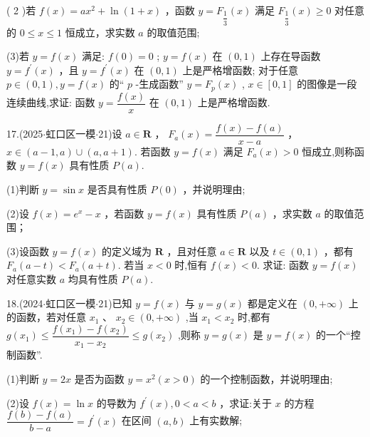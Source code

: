 ( 2 )若 $f\left( x\right)  = a{x}^{2} + \ln \left( {1 + x}\right)$ ，函数 $y = {F}_{\dfrac{1}{3}}\left( x\right)$ 满足 ${F}_{\dfrac{1}{3}}\left( x\right)  \geq  0$ 对任意的 $0 \leq  x \leq  1$ 恒成立，求实数 $a$ 的取值范围;

(3)若 $y = f\left( x\right)$ 满足:   $f\left( 0\right)  = 0$ ;    $y = f\left( x\right)$ 在 $\left( {0,1}\right)$ 上存在导函数 $y = {f}^{\prime }\left( x\right)$ ，且 $y = {f}^{\prime }\left( x\right)$ 在 $\left( {0,1}\right)$ 上是严格增函数;    对于任意 $p \in  \left( {0,1}\right) ,y = f\left( x\right)$ 的“ $p$ -生成函数” $y = {F}_{p}\left( x\right)$ , $x \in  \left\lbrack  {0,1}\right\rbrack$ 的图像是一段连续曲线,求证: 函数 $y = \dfrac{f\left( x\right) }{x}$ 在 $\left( {0,1}\right)$ 上是严格增函数.

17.(2025$\cdot$虹口区一模$\cdot$21)设 $a \in  \mathbf{R}$ ， ${F}_{a}\left( x\right)  = \dfrac{f\left( x\right)  - f\left( a\right) }{x - a}$ ， $x \in  \left( {a - 1,a}\right)  \cup  \left( {a,a + 1}\right)$. 若函数 $y =  f\left( x\right)$ 满足 ${F}_{a}\left( x\right)  > 0$ 恒成立,则称函数 $y = f\left( x\right)$ 具有性质 $P\left( a\right)$.

(1)判断 $y = \sin x$ 是否具有性质 $P\left( 0\right)$ ，并说明理由;

(2)设 $f\left( x\right)  = {{e}}^{x} - x$ ，若函数 $y = f\left( x\right)$ 具有性质 $P\left( a\right)$ ，求实数 $a$ 的取值范围；

(3)设函数 $y = f\left( x\right)$ 的定义域为 $\mathbf{R}$ ，且对任意 $a \in  \mathbf{R}$ 以及 $t \in  \left( {0,1}\right)$ ，都有 ${F}_{a}\left( {a - t}\right)  < {F}_{a}\left( {a + t}\right)$. 若当 $x < 0$ 时,恒有 $f\left( x\right)  < 0$. 求证: 函数 $y = f\left( x\right)$ 对任意实数 $a$ 均具有性质 $P\left( a\right)$.

18.(2024$\cdot$虹口区一模$\cdot$21)已知 $y = f\left( x\right)$ 与 $y = g\left( x\right)$ 都是定义在 $\left( {0, + \infty }\right)$ 上的函数，若对任意 ${x}_{1}$ 、 ${x}_{2} \in  \left( {0, + \infty }\right)$ ,当 ${x}_{1} < {x}_{2}$ 时,都有 $g\left( {x}_{1}\right)  \leq  \dfrac{f\left( {x}_{1}\right)  - f\left( {x}_{2}\right) }{{x}_{1} - {x}_{2}} \leq  g\left( {x}_{2}\right)$ ,则称 $y = g\left( x\right)$ 是 $y = f\left( x\right)$ 的一个“控制函数”.

(1)判断 $y = {2x}$ 是否为函数 $y = {x}^{2}\left( {x > 0}\right)$ 的一个控制函数，并说明理由;

(2)设 $f\left( x\right)  = \ln x$ 的导数为 ${f}^{\prime }\left( x\right) ,0 < a < b$ ，求证:关于 $x$ 的方程 $\dfrac{f\left( b\right)  - f\left( a\right) }{b - a} = {f}^{\prime }\left( x\right)$ 在区间 $\left( {a,b}\right)$ 上有实数解;

